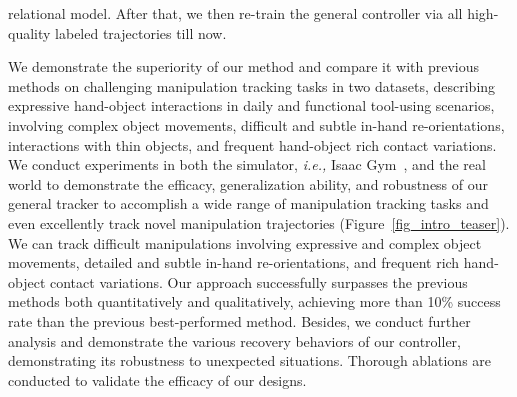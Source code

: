 relational model. After that, we then re-train the general controller via all high-quality labeled trajectories till now. 


We demonstrate the superiority of our method and compare it with previous methods on challenging manipulation tracking tasks in two datasets, describing expressive hand-object interactions in daily and functional tool-using scenarios, involving complex object movements, difficult and subtle in-hand re-orientations, interactions with thin objects, and frequent hand-object rich contact variations. We conduct experiments in both the simulator, \emph{i.e.,} Isaac Gym~\citep{makoviychuk2021isaac},  and the real world to demonstrate the efficacy, generalization ability, and robustness of our general tracker to accomplish a wide range of manipulation tracking tasks and even excellently track novel manipulation trajectories (Figure~\ref{fig_intro_teaser}). We can track difficult manipulations involving expressive and complex object movements, detailed and subtle in-hand re-orientations, and frequent rich hand-object contact variations. Our approach successfully surpasses the previous methods both quantitatively and qualitatively, achieving more than 10\% success rate than the previous best-performed method. Besides, we conduct further analysis and demonstrate the various recovery behaviors of our controller, demonstrating its robustness to unexpected situations. Thorough ablations are conducted to validate the efficacy of our designs.

